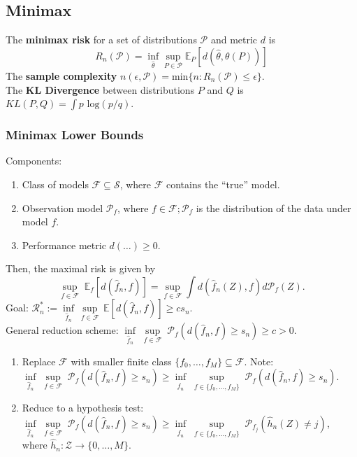 \documentclass[10pt,twocolumn]{article}
\begin{document}
\subsection*{Minimax}
    The \textbf{minimax risk} for a set of distributions $\mathcal{P}$ and metric $d$ is
    \begin{equation}
       R_n(\mathcal{P}) = \inf_{\hat{\theta}}  \sup_{P \in \mathcal{P}} \mathbb{E}_P [ d(\hat{\theta}, \theta(P))  ]
    \end{equation}
    The \textbf{sample complexity} $n(\epsilon,\mathcal{P}) = \text{min}\{n : R_n(\mathcal{P}) \leq \epsilon\}$.\\
    The \textbf{KL Divergence} between distributions $P$ and $Q$ is $KL(P,Q) = \int p \text{ log}(p/q)$.

\subsubsection*{Minimax Lower Bounds}
        Components:
    \begin{enumerate}
        \itemsep-.5em
        \item Class of models $\mathcal{F} \subseteq \mathcal{S}$, where $\mathcal{F}$ contains the ``true'' model.
        \item Observation model $\mathcal{P}_f$, where $f \in \mathcal{F}; \mathcal{P}_f$ is the distribution of the data under model $f$.
        \item Performance metric $d(\ldots) \geq 0$.
    \end{enumerate}
    Then, the maximal risk is given by 
    \begin{equation}
        \underset{f\in \mathcal{F}}{\sup} \; \mathbb{E}_f \left[d(\hat{f}_n,f)\right] = \underset{f\in\mathcal{F}}{\sup} \int d(\hat{f}_n(Z),f)d\mathcal{P}_f(Z).
    \end{equation}
    Goal: $\mathcal{R}^*_n := \underset{\hat{f}_n}{\inf}\,\underset{f\in\mathcal{F}}{\sup} \,\mathbb{E} \left[d(\hat{f}_n,f)\right] \geq cs_n$.\\
    General reduction scheme: $\underset{\hat{f}_n}{\inf} \; \underset{f\in\mathcal{F}}{\sup} \; \mathcal{P}_f(d(\hat{f}_n,f) \geq s_n) \geq c > 0$.
    \begin{enumerate}
        \item Replace $\mathcal{F}$ with smaller finite class $\lbrace f_0,\ldots,f_M \rbrace \subseteq \mathcal{F}$. Note: $\underset{\hat{f}_n}{\inf} \; \underset{f\in\mathcal{F}}{\sup} \; \mathcal{P}_f(d(\hat{f}_n,f) \geq s_n) \geq \underset{\hat{f}_n}{\inf} \; \underset{f \in \lbrace f_0,\ldots,f_M \rbrace}{\sup} \; \mathcal{P}_f(d(\hat{f}_n,f) \geq s_n)$.
        \item Reduce to a hypothesis test: $\underset{\hat{f}_n}{\inf} \; \underset{f \in \mathcal{F}}{\sup} \; \mathcal{P}_f(d(\hat{f}_n,f) \geq s_n) \geq \underset{\hat{f}_n}{\inf} \; \underset{f \in \lbrace f_0,\ldots,f_M \rbrace}{\sup} \; \mathcal{P}_{f_j}(\hat{h}_n(Z) \neq j)$, where $\hat{h}_n : \mathcal{Z} \rightarrow \lbrace 0,\ldots,M \rbrace$.
    \end{enumerate}
\end{document}
